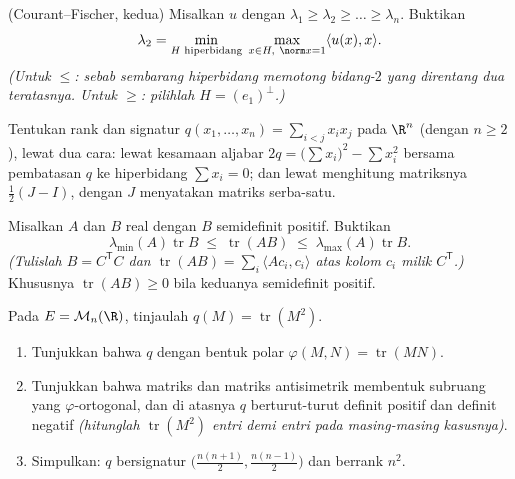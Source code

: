 \begin{exercise}[$\star\star\star$]\label{exo:b2:quadratic:9}
(Courant--Fischer,  kedua) Misalkan $u$  dengan
 $\lambda_1 \geq \lambda_2 \geq \dots \geq \lambda_n$.
Buktikan
\[
\lambda_2 = \min_{\substack{H \text{ hiperbidang}}}\;
\max_{\substack{x \in H,\ \norm x = 1}} \langle u(x), x\rangle .
\]
\emph{(Untuk $\leq$: sebab sembarang hiperbidang memotong bidang-$2$ yang
direntang dua  teratasnya. Untuk $\geq$: pilihlah $H =
(e_1)^{\perp}$.)}
\end{exercise}

\begin{exercise}[$\star\star$]\label{exo:b2:quadratic:10}
Tentukan rank dan signatur $q(x_1, \dots, x_n) = \sum_{i <
j} x_ix_j$ pada $\R^n$ (dengan $n \geq 2$), lewat dua cara: lewat kesamaan
aljabar $2q = \bigl(\sum x_i\bigr)^2 - \sum x_i^2$ bersama
pembatasan $q$ ke hiperbidang $\sum x_i = 0$;
dan lewat menghitung  matriksnya $\frac12(J - I)$,
dengan $J$ menyatakan matriks serba-satu.
\end{exercise}

\begin{exercise}[$\star\star$]\label{exo:b2:quadratic:11}
Misalkan $A$ dan $B$  real dengan $B$ semidefinit positif.
Buktikan
\[
\lambda_{\min}(A)\operatorname{tr} B
\;\leq\;
\operatorname{tr}(AB)
\;\leq\;
\lambda_{\max}(A)\operatorname{tr} B .
\]
\emph{(Tulislah $B = C^{\mathsf T}C$ dan $\operatorname{tr}(AB) =
\sum_i \langle A c_i, c_i\rangle$ atas kolom $c_i$ milik
$C^{\mathsf T}$.)} Khususnya $\operatorname{tr}(AB) \geq 0$
bila keduanya semidefinit positif.
\end{exercise}

\begin{exercise}[$\star\star\star$]\label{exo:b2:quadratic:12}
Pada $E = \mathcal{M}_n(\R)$, tinjaulah $q(M) =
\operatorname{tr}(M^2)$.
\begin{enumerate}
  \item Tunjukkan bahwa $q$  dengan bentuk polar
        $\varphi(M, N) = \operatorname{tr}(MN)$.
  \item Tunjukkan bahwa matriks  dan matriks antisimetrik
        membentuk subruang yang $\varphi$-ortogonal, dan di atasnya $q$
        berturut-turut definit positif dan definit negatif
        \emph{(hitunglah $\operatorname{tr}(M^2)$ entri demi entri pada
        masing-masing kasusnya)}.
  \item Simpulkan: $q$ bersignatur $\bigl(\frac{n(n+1)}{2},
        \frac{n(n-1)}{2}\bigr)$ dan berrank $n^2$.
\end{enumerate}
\end{exercise}

